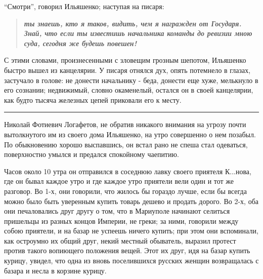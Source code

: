 ``Смотри'', говорил Ильяшенко; наступая на писаря:
\begin{quote}
\em\bfseries	
ты знаешь, кто я таков, видить, чем я награжден от
Государя. Знай, что если ты известишь начальника команды до ревизии мною суда,
сегодня же будешь повешен!
\end{quote}

С этими словами, произнесенными с зловещим грозным шепотом, Ильяшенко быстро
вышел из канцелярии.  У писаря отнялся дух, опять потемнело в глазах, застучало
в голове: не донести начальнику - беда, донести еще хуже, мелькнуло в его
сознании; недвижимый, словно окаменелый, остался он в своей канцелярии, как
будто тысяча железных цепей приковали его к месту.

\par\noindent\rule{\textwidth}{0.4pt}

Николай Фотиевич Логафетов, не обратив никакого внимания на угрозу почти
вытолкнутого им из своего дома Ильяшенко, на утро совершенно о нем позабыл. 
По обыкновению хорошо выспавшись, он встал рано не спеша стал одеваться, поверхностно 
умылся и предался спокойному чаепитию.

Часов около 10 утра он отправился в соседнюю лавку своего приятеля К...нова, где он бывал каждое утро
и где каждое утро приятели вели один и тот же разговор.
Во 1-х, они говорили, что жилось бы гораздо лучше, если
бы всегда можно было быть уверенным купить товарь дешево и продать дорого. Во
2-х, оба они печаловались друг другу о том, что в Мариуполе начинают селиться пришельцы из разных концов Империи, не греки;
за ними, говорили между собою приятели, и на базар не успеешь ничего купить;
при этом они вспоминали, как остроумно их общий друг, некий местный обыватель, выразил протест 
против такого вопиющего положения вещей. Этот их
друг, идя на базар купить курицу, увидел, что одна из
вновь поселившихся русских женщин возвращалась с базара и несла в корзине курицу. 

